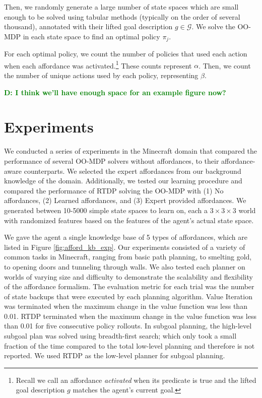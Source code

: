 \documentclass[conference]{IEEEtran}
\newcommand{\dnote}[1]{\textcolor{Green}{\textbf{D: #1}}}
\begin{document}
Then, we randomly generate a large number of state spaces which are small 
enough to be solved using tabular methods (typically on the order of several thousand), 
annotated with their lifted goal description $g \in \mathcal{G}$. We solve the 
OO-MDP in each state space to find an optimal policy $\pi_j$.

For each optimal policy, we count the number of policies that used each action 
when each affordance was activated.\footnote{Recall we call an affordance {\it activated} 
when its predicate is true and the lifted goal description $g$ matches the agent's current goal.} 
These counts represent $\alpha$. Then, we count the number of unique actions used by each policy, representing $\beta$. 

\dnote{I think we'll have enough space for an example figure now?}

\section{Experiments}
\label{sec:experiments}

We conducted a series of experiments in the Minecraft domain that
compared the performance of several OO-MDP solvers without affordances,
to their affordance-aware counterparts. We selected the expert
affordances from our background knowledge of the domain. Additionally, we
tested our learning procedure and compared the performance of RTDP solving the OO-MDP
with (1) No affordances, (2) Learned affordances, and (3) Expert provided affordances. We generated between 10-5000 simple state
spaces to learn on, each a $3\times3\times3$ world with randomized features based on the features of the agent's actual state space.

We gave the agent a single knowledge base of 5 types of affordances,
which are listed in Figure \ref{fig:afford_kb_exp}.  Our experiments
consisted of a variety of common tasks in Minecraft, ranging from
basic path planning, to smelting gold, to opening doors and tunneling
through walls.  We also tested each planner on worlds of varying size
and difficulty to demonstrate the scalability and flexibility of the
affordance formalism. The evaluation metric for each trial was the
number of state backups that were executed by each planning
algorithm. Value Iteration was terminated when the maximum change in
the value function was less than 0.01. RTDP terminated when the
maximum change in the value function was less than 0.01 for five
consecutive policy rollouts. In subgoal planning, the high-level
subgoal plan was solved using breadth-first search; which only took a
small fraction of the time compared to the total low-level planning
and therefore is not reported.  We used RTDP as the low-level planner
for subgoal planning.
\end{document}

